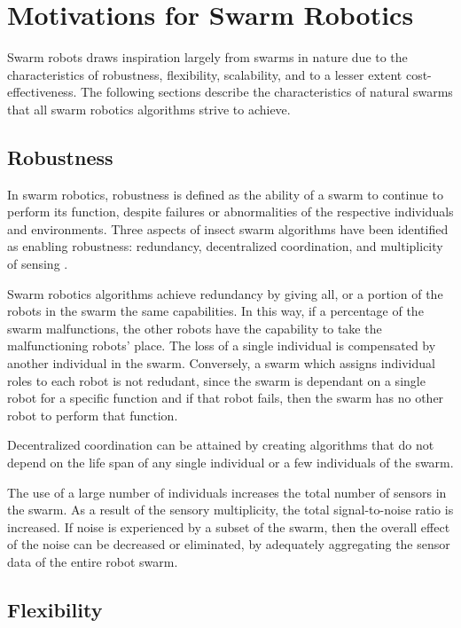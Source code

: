 \section{Motivations for Swarm Robotics}
\label{motivations}

Swarm robots draws inspiration largely from swarms in nature due to the characteristics of robustness, flexibility, scalability, and to a lesser extent cost-effectiveness. The following sections describe the characteristics of natural swarms that all swarm robotics algorithms strive to achieve. 

\subsection{Robustness}
\label{robustness}


In swarm robotics, robustness is defined as the ability of a swarm to continue to perform its function, despite failures or abnormalities of the respective individuals and environments. Three aspects of insect swarm algorithms have been identified as enabling robustness: redundancy, decentralized coordination, and multiplicity of sensing \cite{csahin2005swarm}. 

Swarm robotics algorithms achieve redundancy by giving all, or a portion of the robots in the swarm the same capabilities. In this way, if a percentage of the swarm malfunctions, the other robots have the capability to take the malfunctioning robots' place. The loss of a single individual is compensated by another individual in the swarm. Conversely, a swarm which assigns individual roles to each robot is not redudant, since the swarm is dependant on a single robot for a specific function and if that robot fails, then the swarm has no other robot to perform that function.

Decentralized coordination can be attained by creating algorithms that do not depend on the life span of any single individual or a few individuals of the swarm.

The use of a large number of individuals increases the total number of sensors in the swarm. As a result of the sensory multiplicity, the total signal-to-noise ratio is increased. If noise is experienced by a subset of the swarm, then the overall effect of the noise can be decreased or eliminated, by adequately aggregating the sensor data of the entire robot swarm.

\subsection{Flexibility}
\label{flexibility}

